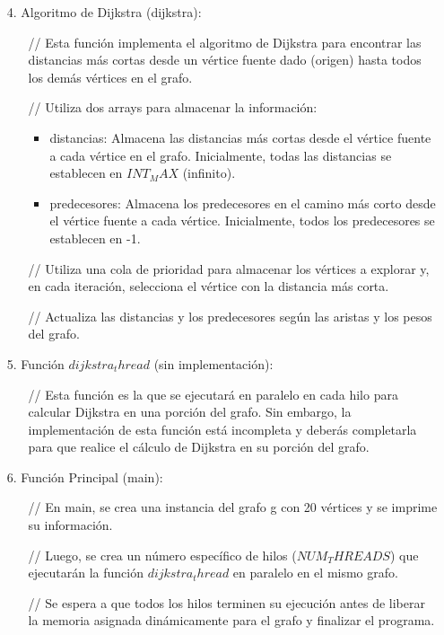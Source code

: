 \documentclass[a4paper,12pt]{article}
\begin{document}
\begin{itemize}
   \item[4.] Algoritmo de Dijkstra (dijkstra):
   \begin{itemize}
      \item[//] Esta función implementa el algoritmo de Dijkstra para encontrar las distancias más cortas desde un vértice fuente dado (origen) hasta todos los demás vértices en el grafo.
      \item[//] Utiliza dos arrays para almacenar la información:
      \begin{itemize}
         \item distancias: Almacena las distancias más cortas desde el vértice fuente a cada vértice en el grafo. Inicialmente, todas las distancias se establecen en $INT_MAX$ (infinito).
         \item predecesores: Almacena los predecesores en el camino más corto desde el vértice fuente a cada vértice. Inicialmente, todos los predecesores se establecen en -1.
      \end{itemize}
      \item[//] Utiliza una cola de prioridad para almacenar los vértices a explorar y, en cada iteración, selecciona el vértice con la distancia más corta.
      \item[//] Actualiza las distancias y los predecesores según las aristas y los pesos del grafo.
   \end{itemize}

   \item[5.] Función $dijkstra_thread$ (sin implementación):
   \begin{itemize}
      \item[//] Esta función es la que se ejecutará en paralelo en cada hilo para calcular Dijkstra en una porción del grafo. Sin embargo, la implementación de esta función está incompleta y deberás completarla para que realice el cálculo de Dijkstra en su porción del grafo.
   \end{itemize}

   \item[6.] Función Principal (main):
   \begin{itemize}
      \item[//] En main, se crea una instancia del grafo g con 20 vértices y se imprime su información.
      \item[//] Luego, se crea un número específico de hilos ($NUM_THREADS$) que ejecutarán la función $dijkstra_thread$ en paralelo en el mismo grafo.
      \item[//] Se espera a que todos los hilos terminen su ejecución antes de liberar la memoria asignada dinámicamente para el grafo y finalizar el programa.
   \end{itemize}
\end{itemize}
\end{document}
